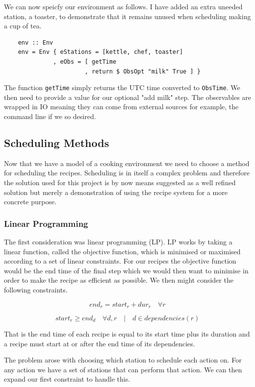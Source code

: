 \documentclass[11pt]{article}
\begin{document}
\medbreak

We can now speicfy our environment as follows. I have added an extra uneeded station, a toaster,
to demonstrate that it remains unused when scheduling making a cup of tea.

\begin{lstlisting}
    env :: Env
    env = Env { eStations = [kettle, chef, toaster]
              , eObs = [ getTime
                       , return $ ObsOpt "milk" True ] }
\end{lstlisting}

The function \texttt{getTime} simply returns the UTC time converted to \texttt{ObsTime}.
We then need to provide a value for our optional "add milk" step. The observables are
wrapped in IO meaning they can come from external sources for example, the command line
if we so desired.

\subsection{Scheduling Methods}

Now that we have a model of a cooking environment we need to choose a method for scheduling the recipes.
Scheduling is in itself a complex problem and therefore the solution used for this project is by
now means suggested as a well refined solution but merely a demonstration of using the recipe system
for a more concrete purpose.

\subsubsection{Linear Programming}
The first consideration was linear programming (LP). LP works by taking a linear function, called
the objective function, which is minimised or maximised according to a set of linear constraints.
For our recipes the objective function would be the end time of the final step which we would then
want to minimise in order to make the recipe as efficient as possible. We then might consider the
following constraints.

\[ end_r = start_r + dur_r \quad \forall r \]

\[ start_r \geq end_d \quad \forall d,r \quad | \quad d \in dependencies(r) \]

That is the end time of each recipe is equal to its start time plus its duration and a recipe
must start at or after the end time of its dependencies.

The problem arose with choosing which station to schedule each action on. For any action we
have a set of stations that can perform that action. We can then expand our first constraint
to handle this.
\end{document}
